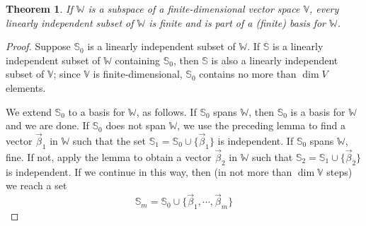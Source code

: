 \documentclass{article}
\newtheorem{theorem}{Theorem}
\begin{document}
    \begin{theorem}
        If \(\mathbb{W}\) is a subspace of a finite-dimensional vector space \(\mathbb{V}\), 
        every linearly independent subset of \(\mathbb{W}\) is finite and is part of a (finite) 
        basis for \(\mathbb{W}\).
    \end{theorem}
    \begin{proof}
        Suppose \(\mathbb{S}_0\) is a linearly independent subset of \(\mathbb{W}\). If 
        \(\mathbb{S}\) is a linearly independent subset of \(\mathbb{W}\) containing \(\mathbb{S}_0\),
        then \(\mathbb{S}\) is also a linearly independent subset of \(\mathbb{V}\); since 
        \(\mathbb{V}\) is finite-dimensional, \(\mathbb{S}_0\) contains no more than \(\dim{V}\) elements.

        We extend \(\mathbb{S}_0\) to a basis for \(\mathbb{W}\), as follows. If \(\mathbb{S}_0\) 
        spans \(\mathbb{W}\), then \(\mathbb{S}_0\) is a basis for \(\mathbb{W}\) and we are done.
        If \(\mathbb{S}_0\) does not span \(\mathbb{W}\), we use the preceding lemma to find a 
        vector \(\vec{\beta}_1\) in \(\mathbb{W}\) such that the set \(\mathbb{S}_1=\mathbb{S}_0 \cup {\{\vec{\beta}_1\}}\) 
        is independent. If \(\mathbb{S}_0\) spans \(\mathbb{W}\), fine. If not, apply the lemma 
        to obtain a vector \(\vec{\beta}_2\) in \(\mathbb{W}\) such that \(\mathbb{S}_2=\mathbb{S}_1 \cup{\{\vec{\beta}_2\}}\)
        is independent. If we continue in this way, then (in not more than \(\dim{\mathbb{V}}\) steps) we reach a set 
        \[\mathbb{S}_m=\mathbb{S}_0 \cup{\{\vec{\beta}_1, \cdots, \vec{\beta}_m\}}\] 
    \end{proof}
\end{document}
